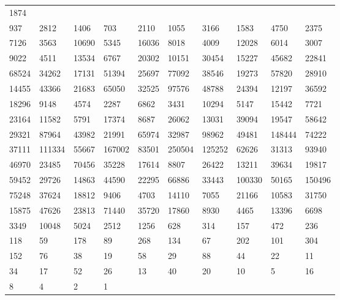 \begin{longtable}{*{10}{l}}
1874&&&&&&&&&\\
937& 2812& 1406& 703& 2110& 1055& 3166& 1583& 4750& 2375\\
7126& 3563& 10690& 5345& 16036& 8018& 4009& 12028& 6014& 3007\\
9022& 4511& 13534& 6767& 20302& 10151& 30454& 15227& 45682& 22841\\
68524& 34262& 17131& 51394& 25697& 77092& 38546& 19273& 57820& 28910\\
14455& 43366& 21683& 65050& 32525& 97576& 48788& 24394& 12197& 36592\\
18296& 9148& 4574& 2287& 6862& 3431& 10294& 5147& 15442& 7721\\
23164& 11582& 5791& 17374& 8687& 26062& 13031& 39094& 19547& 58642\\
29321& 87964& 43982& 21991& 65974& 32987& 98962& 49481& 148444& 74222\\
37111& 111334& 55667& 167002& 83501& 250504& 125252& 62626& 31313& 93940\\
46970& 23485& 70456& 35228& 17614& 8807& 26422& 13211& 39634& 19817\\
59452& 29726& 14863& 44590& 22295& 66886& 33443& 100330& 50165& 150496\\
75248& 37624& 18812& 9406& 4703& 14110& 7055& 21166& 10583& 31750\\
15875& 47626& 23813& 71440& 35720& 17860& 8930& 4465& 13396& 6698\\
3349& 10048& 5024& 2512& 1256& 628& 314& 157& 472& 236\\
118& 59& 178& 89& 268& 134& 67& 202& 101& 304\\
152& 76& 38& 19& 58& 29& 88& 44& 22& 11\\
34& 17& 52& 26& 13& 40& 20& 10& 5& 16\\
8& 4& 2& 1& \\


\end{longtable}

